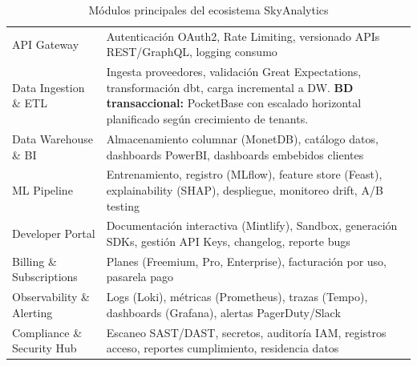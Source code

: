 ﻿\documentclass[11pt, letterpaper]{article}
\begin{document}
\begin{table}[H]

\small

\centering

\begin{tabularx}{\linewidth}{>{\raggedright\arraybackslash}p{3.5cm} >{\raggedright\arraybackslash}X}

\toprule

\multicolumn{1}{>{\raggedright\arraybackslash}p{3.5cm}}{\textbf{Módulo}} &

\multicolumn{1}{>{\raggedright\arraybackslash}X}{\textbf{Descripción}} \\

\midrule

API Gateway & Autenticación OAuth2, Rate Limiting, versionado APIs REST/GraphQL, logging consumo \\

\midrule

Data Ingestion \& ETL & Ingesta proveedores, validación Great Expectations, transformación dbt, carga incremental a DW. \textbf{BD transaccional:} PocketBase con escalado horizontal planificado según crecimiento de tenants. \\

\midrule

Data Warehouse \& BI & Almacenamiento columnar (MonetDB), catálogo datos, dashboards PowerBI, dashboards embebidos clientes \\

\midrule

ML Pipeline & Entrenamiento, registro (MLflow), feature store (Feast), explainability (SHAP), despliegue, monitoreo drift, A/B testing \\

\midrule

Developer Portal & Documentación interactiva (Mintlify), Sandbox, generación SDKs, gestión API Keys, changelog, reporte bugs \\

\midrule

Billing \& Subscriptions & Planes (Freemium, Pro, Enterprise), facturación por uso, pasarela pago \\

\midrule

Observability \& Alerting & Logs (Loki), métricas (Prometheus), trazas (Tempo), dashboards (Grafana), alertas PagerDuty/Slack \\

\midrule

Compliance \& Security Hub & Escaneo SAST/DAST, secretos, auditoría IAM, registros acceso, reportes cumplimiento, residencia datos \\

\bottomrule

\end{tabularx}

\caption{Módulos principales del ecosistema SkyAnalytics}

\end{table}
\end{document}
